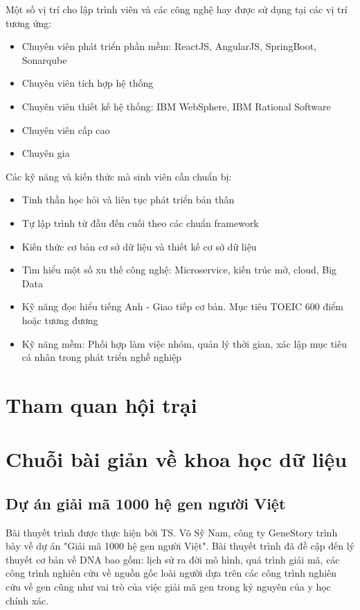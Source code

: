 \documentclass[14pt, a4paper]{article}
\numberwithin{equation}{section}
\numberwithin{figure}{section}
\numberwithin{dl}{section}
\numberwithin{md}{section}
\numberwithin{bd}{section}
\numberwithin{dn}{section}
\numberwithin{hq}{section}
\begin{document}
    Một số vị trí cho lập trình viên và các công nghệ hay được sử dụng tại các vị trí tương ứng:

    \begin{itemize}
        \item Chuyên viên phát triển phần mềm: ReactJS, AngularJS, SpringBoot, Sonarqube
        \item Chuyên viên tích hợp hệ thống
        \item Chuyên viên thiết kế hệ thống: IBM WebSphere, IBM Rational Software
        \item Chuyên viên cấp cao
        \item Chuyên gia
    \end{itemize}

    Các kỹ năng và kiến thức mà sinh viên cần chuẩn bị:

    \begin{itemize}
        \item Tinh thần học hỏi và liên tục phát triển bản thân
        \item Tự lập trình từ đầu đến cuối theo các chuẩn framework
        \item Kiến thức cơ bản cơ sở dữ liệu và thiết kế cơ sở dữ liệu
        \item Tìm hiểu một số xu thế công nghệ: Microservice, kiến trúc mở, cloud, Big Data
        \item Kỹ năng đọc hiểu tiếng Anh - Giao tiếp cơ bản. Mục tiêu TOEIC 600 điểm hoặc tương đương
        \item Kỹ năng mềm: Phối hợp làm việc nhóm, quản lý thời gian, xác lập mục tiêu cá nhân trong phát triển nghề nghiệp
    \end{itemize}
    \section{Tham quan hội trại}

    \section{Chuỗi bài giản về khoa học dữ liệu}

    \subsection{Dự án giải mã 1000 hệ gen người Việt}

    Bài thuyết trình được thực hiện bởi TS. Võ Sỹ Nam, công ty GeneStory trình bày về dự án "Giải mã 1000 hệ gen người Việt".
    Bài thuyết trình đã đề cập đến lý thuyết cơ bản về DNA bao gồm: lịch sử ra đời mô hình, quá trình giải mã, các công trình nghiên cứu về nguồn gốc loài người dựa trên các công trình nghiên cứu về gen cũng như vai trò của việc giải mã gen trong kỷ nguyên của y học chính xác.
\end{document}
